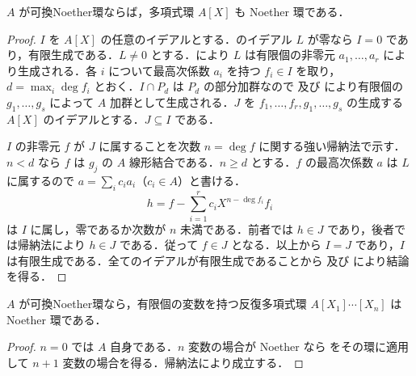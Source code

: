 \begin{prop}[Hilbert基底定理]
$A$ が可換Noether環ならば，多項式環 $A[X]$ も Noether 環である．
\end{prop}
\begin{proof}
$I$ を $A[X]$ の任意のイデアルとする．のイデアル $L$ が零なら $I=0$ であり，有限生成である．$L\ne0$ とする．により $L$ は有限個の非零元 $a_1,\ldots,a_r$ により生成される．各 $i$ について最高次係数 $a_i$ を持つ $f_i\in I$ を取り，$d=\max_i\deg f_i$ とおく．$I\cap P_d$ は $P_d$ の部分加群なので 及び により有限個の $g_1,\ldots,g_s$ によって $A$ 加群として生成される．$J$ を $f_1,\ldots,f_r,g_1,\ldots,g_s$ の生成する $A[X]$ のイデアルとする．$J\subseteq I$ である．

$I$ の非零元 $f$ が $J$ に属することを次数 $n=\deg f$ に関する強い帰納法で示す．$n<d$ なら $f$ は $g_j$ の $A$ 線形結合である．$n\ge d$ とする．$f$ の最高次係数 $a$ は $L$ に属するので $a=\sum_i c_i a_i$（$c_i\in A$）と書ける．
\[
h=f-\sum_{i=1}^r c_i X^{n-\deg f_i}f_i
\]
は $I$ に属し，零であるか次数が $n$ 未満である．前者では $h\in J$ であり，後者では帰納法により $h\in J$ である．従って $f\in J$ となる．以上から $I=J$ であり，$I$ は有限生成である．全てのイデアルが有限生成であることから 及び により結論を得る．
\end{proof}
\begin{prop}[有限変数多項式環のNoether性]
$A$ が可換Noether環なら，有限個の変数を持つ反復多項式環 $A[X_1]\cdots[X_n]$ は Noether 環である．
\end{prop}
\begin{proof}
$n=0$ では $A$ 自身である．$n$ 変数の場合が Noether なら をその環に適用して $n+1$ 変数の場合を得る．帰納法により成立する．
\end{proof}
